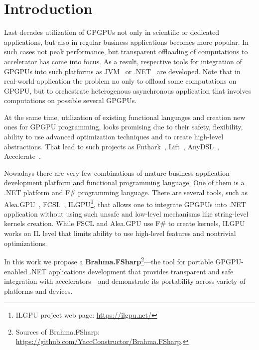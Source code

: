 \section{Introduction}

Last decades utilization of GPGPUs not only in scientific or dedicated applications, but also in regular business applications becomes more popular.
In such cases not peak performance, but transparent offloading of computations to accelerator has come into focus.
As a result, respective tools for integration of GPGPUs into such platforms as JVM~\cite{rootbeer,jcuda,ScalaGPU} or .NET~\cite{FSCLPhD,aleaGPUasync} are developed.
Note that in real-world application the problem no only to offload some computations on GPGPU, but to orchestrate heterogenous asynchronous application that involves computations on possible several GPGPUs.

At the same time, utilization of existing functional languages and creation new ones for GPGPU programming, looks promising due to their safety, flexibility, ability to use advanced optimization techniques and to create high-level abstractions.
That lead to such projects as Futhark~\cite{10.1145/3140587.3062354}, Lift~\cite{10.5555/3049832.3049841}, AnyDSL~\cite{10.1145/3276489}, Accelerate~\cite{10.1145/1926354.1926358}.
 
Nowadays there are very few combinations of mature business application development platform and functional programming language.
One of them is a .NET platform and F\# programming language. 
There are several tools, such as Alea.GPU~\cite{aleaGPUasync}, FCSL~\cite{FSCLPhD}, ILGPU\footnote{ILGPU project web page: \url{https://ilgpu.net/}}, that allows one to integrate GPGPUs into .NET application without using such unsafe and low-level mechanisms like string-level kernels creation. 
While FSCL and Alea.GPU use F\# to create kernels, ILGPU works on IL level that limits ability to use high-level features and nontrivial optimizations.
 
In this work we propose a \textbf{Brahma.FSharp}\footnote{
    Sources of Brahma.FSharp: \url{https://github.com/YaccConstructor/Brahma.FSharp}.
}---the tool for portable GPGPU-enabled .NET applications development that provides transparent and safe integration with accelerators---and demonstrate its portability across variety of platforms and devices. 
